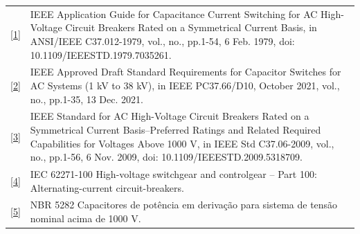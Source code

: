 \documentclass[a4paper]{article}
\begin{document}
\noindent
\begin{tabular}{p{0.2cm} p{15.8cm}}
    \href{https://ieeexplore.ieee.org/document/7035261}{[1]} &
    \begin{minipage}[t]{15.8cm}
        IEEE Application Guide for Capacitance Current Switching for AC High-Voltage Circuit Breakers Rated on a Symmetrical Current Basis, in ANSI/IEEE C37.012-1979, vol., no., pp.1-54, 6 Feb. 1979, doi: 10.1109/IEEESTD.1979.7035261.
    \end{minipage} \\

    \href{https://ieeexplore.ieee.org/document/9574631}{[2]} &
    \begin{minipage}[t]{15.8cm}
        IEEE Approved Draft Standard Requirements for Capacitor Switches for AC Systems (1 kV to 38 kV), in IEEE PC37.66/D10, October 2021, vol., no., pp.1-35, 13 Dec. 2021.
    \end{minipage} \\

    \href{https://ieeexplore.ieee.org/document/5318709}{[3]} &
    \begin{minipage}[t]{15.8cm}
        IEEE Standard for AC High-Voltage Circuit Breakers Rated on a Symmetrical Current Basis--Preferred Ratings and Related Required Capabilities for Voltages Above 1000 V, in IEEE Std C37.06-2009, vol., no., pp.1-56, 6 Nov. 2009, doi: 10.1109/IEEESTD.2009.5318709.
    \end{minipage} \\

    \href{https://cdn.standards.iteh.ai/samples/101972/4e7e06bd66d2443da668b8e0c6c60512/IEC-62271-100-2021.pdf}{[4]} &
    \begin{minipage}[t]{15.8cm}
        IEC 62271-100 High-voltage switchgear and controlgear – Part 100: Alternating-current circuit-breakers.
    \end{minipage} \\

    \href{https://www.normas.com.br/autorizar/visualizacao-nbr/313/identificar/visitante}{[5]} &
    \begin{minipage}[t]{15.8cm}
        NBR 5282 Capacitores de potência em derivação para sistema de tensão nominal acima de 1000 V.
    \end{minipage} \\
\end{tabular}
\end{document}
